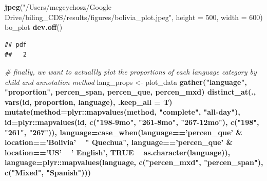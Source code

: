 \documentclass[
]{article}
\newenvironment{Shaded}{\begin{snugshade}}{\end{snugshade}}
\newcommand{\CommentTok}[1]{\textcolor[rgb]{0.56,0.35,0.01}{\textit{#1}}}
\newcommand{\DataTypeTok}[1]{\textcolor[rgb]{0.13,0.29,0.53}{#1}}
\newcommand{\DecValTok}[1]{\textcolor[rgb]{0.00,0.00,0.81}{#1}}
\newcommand{\KeywordTok}[1]{\textcolor[rgb]{0.13,0.29,0.53}{\textbf{#1}}}
\newcommand{\NormalTok}[1]{#1}
\newcommand{\OperatorTok}[1]{\textcolor[rgb]{0.81,0.36,0.00}{\textbf{#1}}}
\newcommand{\OtherTok}[1]{\textcolor[rgb]{0.56,0.35,0.01}{#1}}
\newcommand{\StringTok}[1]{\textcolor[rgb]{0.31,0.60,0.02}{#1}}
\begin{document}
\begin{Shaded}
\begin{Highlighting}[]
\KeywordTok{jpeg}\NormalTok{(}\StringTok{"/Users/megcychosz/Google Drive/biling_CDS/results/figures/bolivia_plot.jpeg"}\NormalTok{, }\DataTypeTok{height =} \DecValTok{500}\NormalTok{, }\DataTypeTok{width =} \DecValTok{600}\NormalTok{)}
\NormalTok{bo_plot}
\KeywordTok{dev.off}\NormalTok{()}
\end{Highlighting}
\end{Shaded}

\begin{verbatim}
## pdf 
##   2
\end{verbatim}

\begin{Shaded}
\begin{Highlighting}[]
\CommentTok{# finally, we want to actuallly plot the proportions of each language category by child and annotation method}
\NormalTok{lang_props <-}\StringTok{ }\NormalTok{plot_data }\OperatorTok{%
\StringTok{  }\KeywordTok{gather}\NormalTok{(}\StringTok{"language"}\NormalTok{, }\StringTok{"proportion"}\NormalTok{, percen_span, percen_que, percen_mxd) }\OperatorTok{%
\StringTok{  }\KeywordTok{distinct_at}\NormalTok{(., }\KeywordTok{vars}\NormalTok{(id, proportion, language), }\DataTypeTok{.keep_all =}\NormalTok{ T) }\OperatorTok{%
\StringTok{  }\KeywordTok{mutate}\NormalTok{(}\DataTypeTok{method=}\NormalTok{plyr}\OperatorTok{::}\KeywordTok{mapvalues}\NormalTok{(method, }\StringTok{"complete"}\NormalTok{, }\StringTok{"all-day"}\NormalTok{),}
         \DataTypeTok{id=}\NormalTok{plyr}\OperatorTok{::}\KeywordTok{mapvalues}\NormalTok{(id, }\KeywordTok{c}\NormalTok{(}\StringTok{"198-9mo"}\NormalTok{, }\StringTok{"261-8mo"}\NormalTok{, }\StringTok{"267-12mo"}\NormalTok{), }\KeywordTok{c}\NormalTok{(}\StringTok{"198"}\NormalTok{, }\StringTok{"261"}\NormalTok{, }\StringTok{"267"}\NormalTok{)),}
         \DataTypeTok{language=}\KeywordTok{case_when}\NormalTok{(language}\OperatorTok{==}\StringTok{'percen_que'} \OperatorTok{&}\StringTok{ }\NormalTok{location}\OperatorTok{==}\StringTok{'Bolivia'} \OperatorTok{~}\StringTok{ " Quechua"}\NormalTok{, }
\NormalTok{                         language}\OperatorTok{==}\StringTok{'percen_que'} \OperatorTok{&}\StringTok{ }\NormalTok{location}\OperatorTok{==}\StringTok{'US'} \OperatorTok{~}\StringTok{ ' English'}\NormalTok{,}
                         \OtherTok{TRUE} \OperatorTok{~}\StringTok{ }\KeywordTok{as.character}\NormalTok{(language)),}
         \DataTypeTok{language=}\NormalTok{plyr}\OperatorTok{::}\KeywordTok{mapvalues}\NormalTok{(language, }\KeywordTok{c}\NormalTok{(}\StringTok{"percen_mxd"}\NormalTok{, }\StringTok{"percen_span"}\NormalTok{), }\KeywordTok{c}\NormalTok{(}\StringTok{"Mixed"}\NormalTok{, }\StringTok{"Spanish"}\NormalTok{))) }\OperatorTok{%
}}}}
\end{Highlighting}
\end{Shaded}
\end{document}
